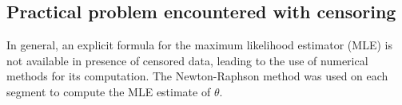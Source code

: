 \subsection{Practical problem encountered with censoring}\label{chp:4:cens_seg}



In general, an explicit formula for the maximum likelihood estimator (MLE) is not available in presence of censored data, leading to the use of numerical methods for its computation. The Newton-Raphson method was used on each segment to compute the MLE estimate of $\theta$. 

